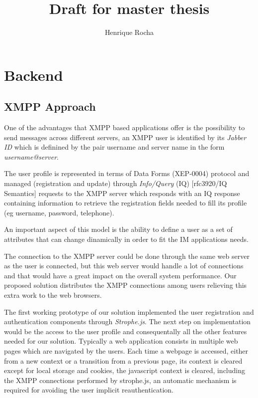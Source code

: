 \documentclass[
10pt, %
a4paper, %
oneside, %
]{scrartcl}
\title{Draft for master thesis} %
\author{Henrique Rocha} %
\date{} %
\begin{document}
\maketitle %


\section{Backend}

\subsection{XMPP Approach}

One of the advantages that XMPP based applications offer is the possibility to send messages across different servers, an XMPP user is identified by its \textit{Jabber ID} which is definined by the pair username and server name in the form \textit{username@server}.

The user profile is represented in terms of Data Forms (XEP-0004) protocol and managed (registration and update) through \textit{Info/Query} (IQ) [rfc3920/IQ Semantics] requests to the XMPP server which responds with an IQ response containing information to retrieve the registration fields needed to fill its profile (eg username, password, telephone). 

An important aspect of this model is the ability to define a user as a set of attributes that can change dinamically in order to fit the IM applications needs. 

The connection to the XMPP server could be done through the same web server as the user is connected, but this web server would handle a lot of connections and that would have a great impact on the overall system performance. Our proposed solution distributes the XMPP connections among users relieving this extra work to the web browsers.

The first working prototype of our solution implemented the user registration and authentication components through \textit{Strophe.js}. The next step on implementation would be the access to the user profile and consequentally all the other features needed for our solution. Typically a web application consists in multiple web pages which are navigated by the users. Each time a webpage is accessed, either from a new context or a transition from a previous page, its context is cleared except for local storage and cookies, the javascript context is cleared, including the XMPP connections performed by strophe.js, an automatic mechanism is required for avoiding the user implicit reauthentication.
\end{document}
